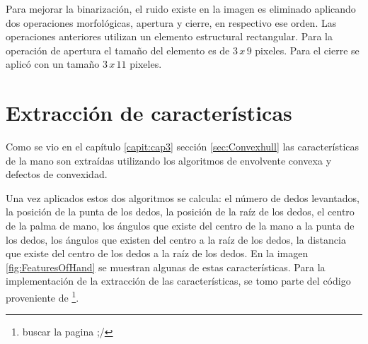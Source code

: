 Para mejorar la binarizaci\'on, el ruido existe en la imagen es eliminado aplicando dos operaciones morfológicas, apertura y cierre, en respectivo ese orden. Las operaciones anteriores utilizan un elemento estructural rectangular. Para la operación de apertura el tamaño del elemento es de $3 \, x \, 9$ pixeles. Para el cierre se aplic\'o con un tamaño  $3\, x \, 11$ pixeles.



\section{Extracción de características}\label{sec:ExtraccionCaracteristicasSystem}

Como se vio en el capítulo \ref{capit:cap3} sección \ref{sec:Convexhull} las características de la mano son extraídas utilizando los algoritmos de envolvente convexa y  defectos de convexidad.


Una vez aplicados estos dos algoritmos se calcula: el número de dedos levantados, la posición de la punta de los dedos, la posición de la raíz de los dedos, el centro de la palma de mano, los ángulos que existe del centro de la mano a la punta de los dedos, los ángulos que existen del centro a la raíz de los dedos, la distancia que existe del centro de los dedos a la raíz de los dedos. En la imagen \ref{fig:FeaturesOfHand} se muestran algunas de estas características. Para la implementación de la extracción de las características, se tomo parte del código proveniente de \footnote{buscar la pagina ;/}. 

